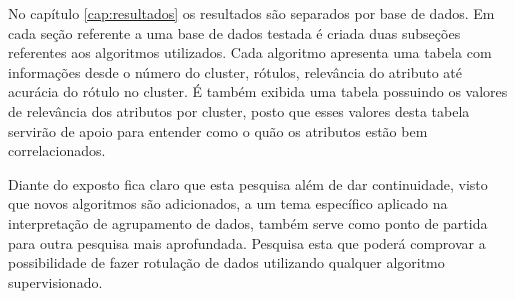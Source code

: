 
No capítulo \ref{cap:resultados} os resultados são separados por base de dados. Em cada seção referente a uma base de dados testada é criada duas subseções referentes aos algoritmos utilizados. Cada algoritmo apresenta uma tabela com informações desde o número do cluster, rótulos, relevância do atributo até acurácia do rótulo no cluster. É também exibida uma tabela possuindo os valores de relevância dos atributos por cluster, posto que esses valores desta tabela servirão de apoio para entender como o quão os atributos estão bem correlacionados.


Diante do exposto fica claro que esta pesquisa além de dar continuidade, visto que novos algoritmos são adicionados, a um tema específico aplicado na interpretação de agrupamento de dados, também serve como ponto de partida para outra pesquisa mais aprofundada. Pesquisa esta que poderá comprovar a possibilidade de fazer rotulação de dados utilizando qualquer algoritmo supervisionado.




